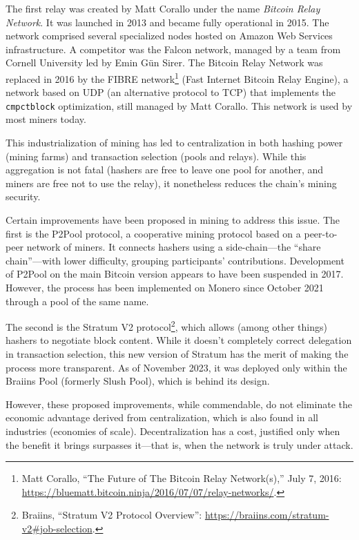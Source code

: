 \documentclass[
  a5paper,
  smalldemyvopaper,10pt,twoside,onecolumn,openright,extrafontsizes,hidelinks]{memoir}
\begin{document}
The first relay was created by Matt Corallo under the name \emph{Bitcoin
Relay Network}. It was launched in 2013 and became fully operational in
2015. The network comprised several specialized nodes hosted on Amazon
Web Services infrastructure. A competitor was the Falcon network,
managed by a team from Cornell University led by Emin Gün Sirer. The
Bitcoin Relay Network was replaced in 2016 by the FIBRE
network\footnote{Matt Corallo, ``The Future of The Bitcoin Relay
  Network(s),'' July 7, 2016:
  \url{https://bluematt.bitcoin.ninja/2016/07/07/relay-networks/}.}
(Fast Internet Bitcoin Relay Engine), a network based on UDP (an
alternative protocol to TCP) that implements the \texttt{cmpctblock}
optimization, still managed by Matt Corallo. This network is used by
most miners today.

This industrialization of mining has led to centralization in both
hashing power (mining farms) and transaction selection (pools and
relays). While this aggregation is not fatal (hashers are free to leave
one pool for another, and miners are free not to use the relay), it
nonetheless reduces the chain's mining security.

Certain improvements have been proposed in mining to address this issue.
The first is the P2Pool protocol, a cooperative mining protocol based on
a peer-to-peer network of miners. It connects hashers using a
side-chain---the ``share chain''---with lower difficulty, grouping
participants' contributions. Development of P2Pool on the main Bitcoin
version appears to have been suspended in 2017. However, the process has
been implemented on Monero since October 2021 through a pool of the same
name.

The second is the Stratum V2 protocol\footnote{Braiins, ``Stratum V2
  Protocol Overview'':
  \url{https://braiins.com/stratum-v2\#job-selection}.}, which allows
(among other things) hashers to negotiate block content. While it
doesn't completely correct delegation in transaction selection, this new
version of Stratum has the merit of making the process more transparent.
As of November 2023, it was deployed only within the Braiins Pool
(formerly Slush Pool), which is behind its design.

However, these proposed improvements, while commendable, do not
eliminate the economic advantage derived from centralization, which is
also found in all industries (economies of scale). Decentralization has
a cost, justified only when the benefit it brings surpasses it---that
is, when the network is truly under attack.
\end{document}

